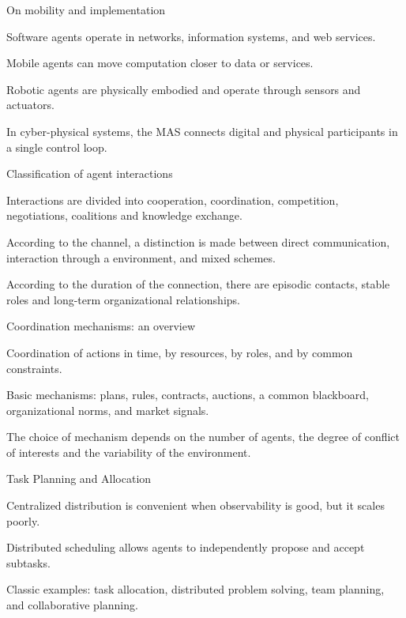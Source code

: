 \begin{frame}{On mobility and implementation}
	\topline
	\justifying
	\begin{textitemize}
		\item Software agents operate in networks, information systems, and web services.
		\item Mobile agents can move computation closer to data or services.
		\item Robotic agents are physically embodied and operate through sensors and actuators.
		\item In cyber-physical systems, the MAS connects digital and physical participants in a single control loop.
	\end{textitemize}
\end{frame}

\begin{frame}{Classification of agent interactions}
	\topline
	\justifying
	\begin{textitemize}
		\item Interactions are divided into cooperation, coordination, competition,\\ negotiations, coalitions and knowledge exchange.
		\item According to the channel, a distinction is made between direct communication, interaction through a environment, and mixed schemes.
		\item According to the duration of the connection, there are episodic contacts, stable roles and long-term organizational relationships.
	\end{textitemize}
\end{frame}

\begin{frame}{Coordination mechanisms: an overview}
	\topline
	\justifying
	\begin{textitemize}
		\item Coordination of actions in time, by resources, by roles, and by common constraints.
		\item Basic mechanisms: plans, rules, contracts, auctions, a common blackboard, organizational norms, and market signals.
		\item The choice of mechanism depends on the number of agents, the degree of conflict of interests and the variability of the environment.
	\end{textitemize}
\end{frame}

\begin{frame}{Task Planning and Allocation}
	\topline
	\justifying
	\begin{textitemize}
		\item Centralized distribution is convenient when observability is good, but it scales poorly.
		\item Distributed scheduling allows agents to independently propose and accept subtasks.
		\item Classic examples: task allocation, distributed problem solving, team planning, and collaborative planning.
	\end{textitemize}
\end{frame}

